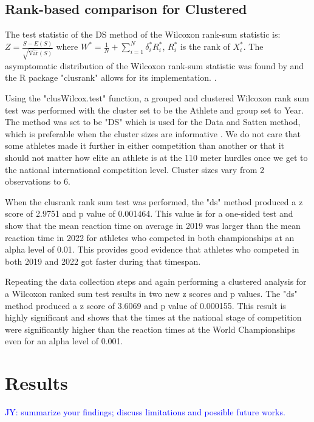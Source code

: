 \documentclass[12pt, letterpaper, titlepage]{article}
\newcommand{\jy}[1]{\textcolor{blue}{JY: #1}}
\begin{document}
\subsection{Rank-based comparison for Clustered}




The test statistic of the DS method of the Wilcoxon rank-sum statistic is:
$Z = \frac{S - E(S)}{\sqrt{\hat{\text{Var}}(S)}}$ where 
$W^* = \frac{1}{N} + \sum_{i=1}^{N} \delta_{i}^{*} R_{i}^{*}$, $R_{i}^{*}$ is
the rank of $X_{i}^{*}$.
The asymptomatic distribution of the Wilcoxon rank-sum statistic was found by
\citet{datta2005rank} and the R package "clusrank" allows for its implementation.
\citep{jiang2017wilcoxon}.


Using the "clusWilcox.test" function, a grouped and clustered Wilcoxon rank sum
test was performed with the cluster set to be the Athlete and group set to Year.
The method was set to be "DS" which is used for the Data and Satten method, which
is preferable when the cluster sizes are informative \citep{jiang2017wilcoxon}.  We do not care that some
athletes made it further in either competition than another or that it should
not matter how elite an athlete is at the 110 meter hurdles once we get to the
national international competition level.  Cluster sizes vary from 2 observations
to 6.

When the clusrank rank sum test was performed, the "ds" method produced a z score of
2.9751 and p value of 0.001464.  This value is for a one-sided test and show that
the mean reaction time on average in 2019 was larger than the mean reaction time
in 2022 for athletes who competed in both championships at an alpha level of 0.01.
This provides good evidence that athletes who competed in both 2019 and 2022 got
faster during that timespan.


Repeating the data collection steps and
again performing a clustered analysis for a Wilcoxon ranked sum test
results in two new z scores and p values.  The "ds" method produced a z score of
3.6069 and p value of 0.000155.  This result is highly significant and shows that
the times at the national stage of competition were significantly higher than
the reaction times at the World Championships even for an alpha level of 0.001.


\section{Results}
\jy{summarize your findings; discuss limitations and possible future works.}
\end{document}
